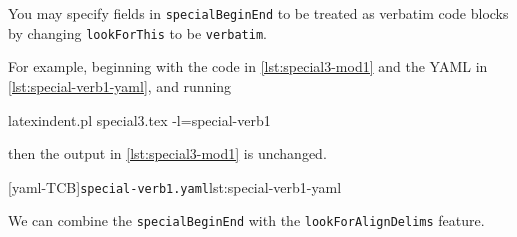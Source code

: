 You may  specify fields in
 \texttt{specialBeginEnd} to be treated as verbatim code blocks by changing
 \texttt{lookForThis} to be \texttt{verbatim}. %

 \begin{example}
 For example, beginning with the code in \cref{lst:special3-mod1} and the YAML in
 \cref{lst:special-verb1-yaml}, and running 

 \begin{commandshell}
latexindent.pl special3.tex -l=special-verb1
\end{commandshell}

 then the output in \cref{lst:special3-mod1} is unchanged.

 \begin{cmhtcbraster}
  [yaml-TCB]{\texttt{special-verb1.yaml}}{lst:special-verb1-yaml}
 \end{cmhtcbraster}
 \end{example}

 We can combine the \texttt{specialBeginEnd} with the \texttt{lookForAlignDelims}
 feature.

